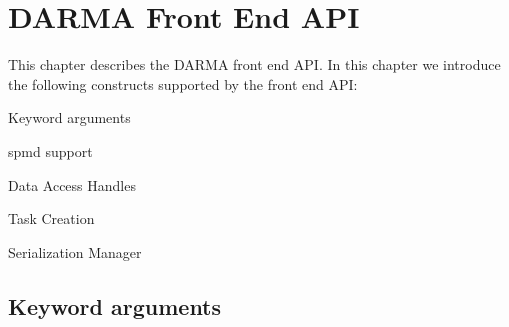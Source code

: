 
\chapter{DARMA Front End API}
\label{chap:front_end}
This chapter describes the DARMA \gls{front end} \gls{API}. In this chapter we
introduce the following constructs supported by the \gls{front end} \gls{API}:
\begin{compactitem}
\item Keyword arguments
\item \gls{spmd} support
\item Data Access Handles
\item Task Creation
\item Serialization Manager
\end{compactitem}

\section{Keyword arguments}
\label{sec:keyword}


